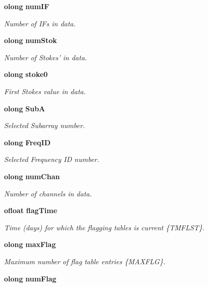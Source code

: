 \begin{CompactItemize}
{\bf olong} {\bf num\-IF}
\begin{CompactList}\small\item\em Number of IFs in data. \item\end{CompactList}\item 
{\bf olong} {\bf num\-Stok}
\begin{CompactList}\small\item\em Number of Stokes' in data. \item\end{CompactList}\item 
{\bf olong} {\bf stoke0}
\begin{CompactList}\small\item\em First Stokes value in data. \item\end{CompactList}\item 
{\bf olong} {\bf Sub\-A}
\begin{CompactList}\small\item\em Selected Subarray number. \item\end{CompactList}\item 
{\bf olong} {\bf Freq\-ID}
\begin{CompactList}\small\item\em Selected Frequency ID number. \item\end{CompactList}\item 
{\bf olong} {\bf num\-Chan}
\begin{CompactList}\small\item\em Number of channels in data. \item\end{CompactList}\item 
{\bf ofloat} {\bf flag\-Time}
\begin{CompactList}\small\item\em Time (days) for which the flagging tables is current \{TMFLST\}. \item\end{CompactList}\item 
{\bf olong} {\bf max\-Flag}
\begin{CompactList}\small\item\em Maximum number of flag table entries \{MAXFLG\}. \item\end{CompactList}\item 
{\bf olong} {\bf num\-Flag}

\end{CompactItemize}
